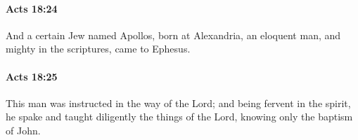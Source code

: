 		\paragraph{Acts 18:24} %
			\label{ACTS-18-24}

			And a certain Jew named Apollos, born at Alexandria, an eloquent man, and mighty in the scriptures, came to Ephesus.

			\begin{framed}
			\scriptsize
				\begin{compactdesc}
					\item[SBLG] 
				\end{compactdesc}
			\end{framed}

		\paragraph{Acts 18:25} %
			\label{ACTS-18-25}

			This man was instructed in the way of the Lord; and being fervent in the spirit, he spake and taught diligently the things of the Lord, knowing only the baptism of John.


